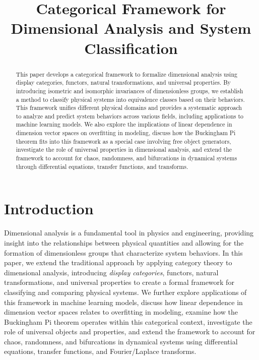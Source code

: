 \documentclass{article}
\title{Categorical Framework for Dimensional Analysis and System Classification}
\author{}
\date{}
\theoremstyle{definition}
\theoremstyle{remark}
\begin{document}
	
	\maketitle
	
	\begin{abstract}
		This paper develops a categorical framework to formalize dimensional analysis using display categories, functors, natural transformations, and universal properties. By introducing isometric and isomorphic invariances of dimensionless groups, we establish a method to classify physical systems into equivalence classes based on their behaviors. This framework unifies different physical domains and provides a systematic approach to analyze and predict system behaviors across various fields, including applications to machine learning models. We also explore the implications of linear dependence in dimension vector spaces on overfitting in modeling, discuss how the Buckingham Pi theorem fits into this framework as a special case involving free object generators, investigate the role of universal properties in dimensional analysis, and extend the framework to account for chaos, randomness, and bifurcations in dynamical systems through differential equations, transfer functions, and transforms.
	\end{abstract}
	
	\tableofcontents
	
	\section{Introduction}
	
	Dimensional analysis is a fundamental tool in physics and engineering, providing insight into the relationships between physical quantities and allowing for the formation of dimensionless groups that characterize system behaviors. In this paper, we extend the traditional approach by applying category theory to dimensional analysis, introducing \emph{display categories}, functors, natural transformations, and universal properties to create a formal framework for classifying and comparing physical systems. We further explore applications of this framework in machine learning models, discuss how linear dependence in dimension vector spaces relates to overfitting in modeling, examine how the Buckingham Pi theorem operates within this categorical context, investigate the role of universal objects and properties, and extend the framework to account for chaos, randomness, and bifurcations in dynamical systems using differential equations, transfer functions, and Fourier/Laplace transforms.
	
\end{document}
